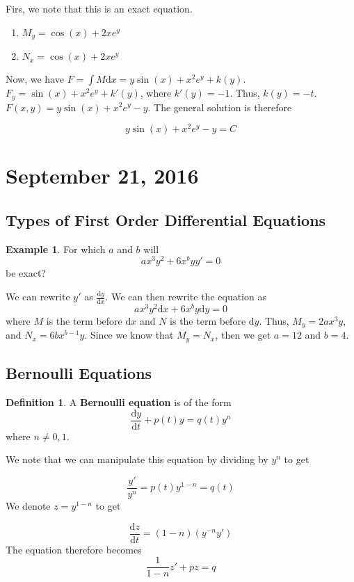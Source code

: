 \documentclass[11pt]{article}
\theoremstyle{plain} %
\theoremstyle{definition}
\newtheorem*{definition}{Definition} %
\theoremstyle{example}
\newtheorem*{example}{Example}
\theoremstyle{remark}
\begin{document}
Firs, we note that this is an exact equation.

\begin{enumerate}
	\item $M_y = \cos(x) + 2xe^y$
	\item $N_x = \cos(x) + 2xe^y$
\end{enumerate}

Now, we have $F = \int M \mathrm d x = y\sin(x) + x^2e^y + k(y)$. $F_y = \sin(x) + x^2e^y + k'(y)$, where $k'(y) = -1$. Thus, $k(y) = -t$. $F(x,y) = y\sin(x) + x^2e^y-y$. The general solution is therefore

$$y\sin(x) + x^2e^y-y=C$$

\section{September 21, 2016}

\subsection{Types of First Order Differential Equations}

\begin{example}
For which $a$ and $b$ will $$ax^3y^2 + 6x^byy' = 0$$ be exact?
\end{example}

We can rewrite $y' $ as $\frac{\mathrm d y}{\mathrm d x}$. We can then rewrite the equation as $$ax^3y^2 \mathrm d x + 6x^by\mathrm d y = 0$$ where $M$ is the term before $\mathrm d x$ and $N$ is the term before $\mathrm d y$. Thus, $M_y= 2ax^3y$, and $N_x = 6bx^{b-1}y$. Since we know that $M_y=N_x$, then we get $a=12$ and $b=4$. 

\subsection{Bernoulli Equations}

\begin{definition}A \textbf{Bernoulli equation} is of the form
$$\frac{\mathrm d y}{\mathrm d t} + p(t) y = q(t)y^n$$
where $n \neq 0, 1$. 
\end{definition}

We note that we can manipulate this equation by dividing by $y^n$ to get

$$\frac{y'}{y^n} = p(t)y^{1-n} = q(t)$$
We denote $z=y^{1-n}$ to get

$$\frac{\mathrm d z}{\mathrm d t} = (1-n)\left(y^{-n}y'\right)$$ The equation therefore becomes
$$\frac{1}{1-n}z' + pz = q$$
\end{document}
